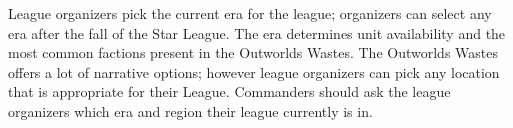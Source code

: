 League organizers pick the current era for the league; organizers can select any era after the fall of the Star League.
The era determines unit availability and the most common factions present in the Outworlds Wastes.
The Outworlds Wastes offers a lot of narrative options; however league organizers can pick any location that is appropriate for their League.
Commanders should ask the league organizers which era and region their league currently is in.
